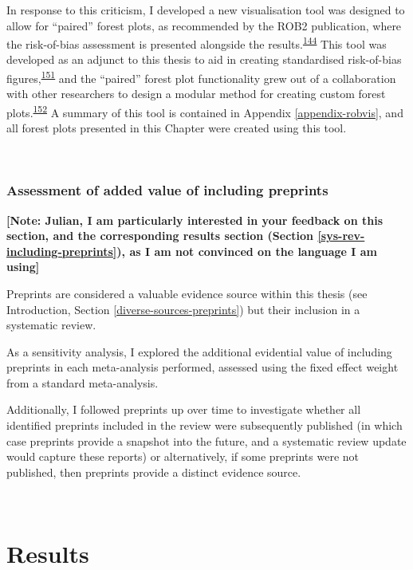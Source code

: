 \documentclass[a4paper, twoside]{templates/ociamthesis}
\begin{document}
In response to this criticism, I developed a new visualisation tool was designed to allow for ``paired'' forest plots, as recommended by the ROB2 publication, where the risk-of-bias assessment is presented alongside the results.\textsuperscript{\protect\hyperlink{ref-sterne2019}{144}} This tool was developed as an adjunct to this thesis to aid in creating standardised risk-of-bias figures,\textsuperscript{\protect\hyperlink{ref-mcguinness2020robvisPaper}{151}} and the ``paired'' forest plot functionality grew out of a collaboration with other researchers to design a modular method for creating custom forest plots.\textsuperscript{\protect\hyperlink{ref-zotero-14999}{152}} A summary of this tool is contained in Appendix \ref{appendix-robvis}, and all forest plots presented in this Chapter were created using this tool.

~

\hypertarget{assessment-of-added-value-of-including-preprints}{%
\subsubsection{Assessment of added value of including preprints}\label{assessment-of-added-value-of-including-preprints}}

\textbf{{[}Note: Julian, I am particularly interested in your feedback on this section, and the corresponding results section (Section \ref{sys-rev-including-preprints}), as I am not convinced on the language I am using{]}}

Preprints are considered a valuable evidence source within this thesis (see Introduction, Section \ref{diverse-sources-preprints}) but their inclusion in a systematic review.

As a sensitivity analysis, I explored the additional evidential value of including preprints in each meta-analysis performed, assessed using the fixed effect weight from a standard meta-analysis.

Additionally, I followed preprints up over time to investigate whether all identified preprints included in the review were subsequently published (in which case preprints provide a snapshot into the future, and a systematic review update would capture these reports) or alternatively, if some preprints were not published, then preprints provide a distinct evidence source.

~

\hypertarget{results}{%
\section{Results}\label{results}}
\end{document}
